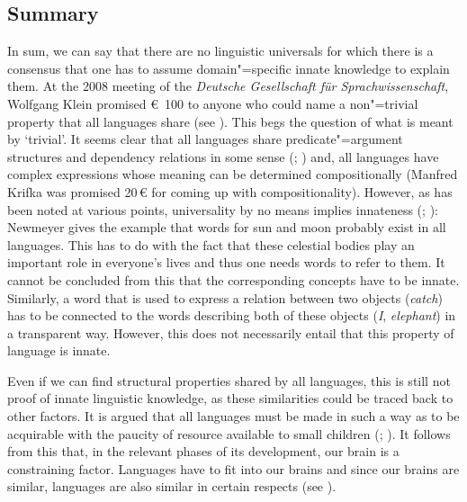 \subsection{Summary}
\label{Abschnitt-Universalien-Zusammenfassung}

In sum, we can say that there are no linguistic universals for which there is a consensus that one
has to assume domain"=specific innate knowledge to explain them.  At the 2008 meeting of the
\emph{Deutsche Gesellschaft für Sprachwissenschaft}, Wolfgang Klein
promised \euro~100 to anyone who could name a non"=trivial property that all languages share
(see \citealp{Klein2009a}). This begs the question of what is meant by `trivial'. It seems clear
that all languages share predicate"=argument structures and
dependency relations in some sense (\citealp[]{Hudson2010a}; \citealp[]{LR2010a}) and, all languages have complex expressions whose meaning can be determined compositionally (Manfred Krifka was promised
20\,\euro{} for coming up with compositionality). However, as has been noted at various
points, universality by no means implies innateness (\citealp[]{Bates84a};
\citealp[]{Newmeyer2005a}): Newmeyer gives the example that words for sun and moon probably
exist in all languages. This has to do with the fact that these celestial bodies play an important
role in everyone's lives and thus one needs words to refer to them.  It cannot be concluded from
this that the corresponding concepts have to be innate. Similarly, a word that is used to express a
relation between two objects (\eg \emph{catch}) has to be connected to the words describing both of
these objects (\emph{I}, \emph{elephant}) in a transparent way. However, this does not necessarily entail that this property of language is innate.

Even if we can find structural properties shared by all languages, this is still not proof of innate linguistic knowledge, as these similarities could
be traced back to other factors. It is argued that all languages must be made in such a way as to be acquirable with the paucity of resource available to small
children (\citealp[Section~10.7.2]{Hurford2002a}; \citealp[]{Behrens2009a}).
It follows from this that, in the relevant phases of its development, our brain is a constraining factor.
Languages have to fit into our brains and since our brains are similar, languages are also similar
in certain respects (see \citealp[]{Kluender92a}).

